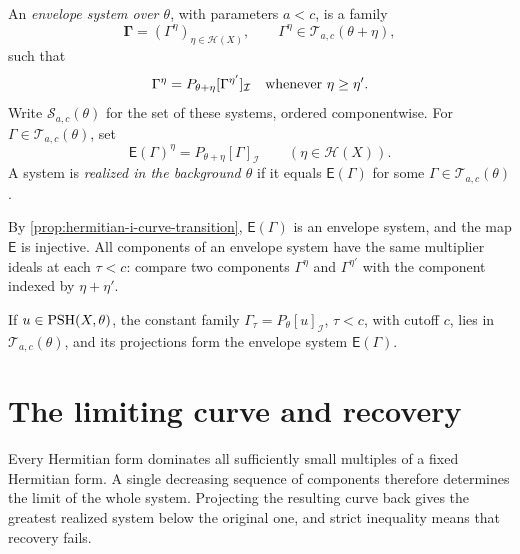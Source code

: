 \begin{definition}\label{def:hermitian-envelope-system}
An \emph{envelope system over $\theta$}, with parameters $a<c$, is a family
\[
 \boldsymbol\Gamma=(\Gamma^\eta)_{\eta\in\mathscr H(X)},
 \qquad \Gamma^\eta\in\mathscr T_{a,c}(\theta+\eta),
\]
such that
\begin{equation}\label{eq:hermitian-system-compatibility}
 \Gamma^\eta=P_{\theta+\eta}[\Gamma^{\eta'}]_{\mathcal I}
 \quad\hbox{whenever }\eta\geq\eta'.
\end{equation}
Write $\mathscr S_{a,c}(\theta)$ for the set of these systems, ordered componentwise. For $\Gamma\in\mathscr T_{a,c}(\theta)$, set
\[
 \mathsf E(\Gamma)^\eta=P_{\theta+\eta}[\Gamma]_{\mathcal I}
 \qquad(\eta\in\mathscr H(X)).
\]
A system is \emph{realized in the background $\theta$} if it equals $\mathsf E(\Gamma)$ for some $\Gamma\in\mathscr T_{a,c}(\theta)$.
\end{definition}

By \cref{prop:hermitian-i-curve-transition}, $\mathsf E(\Gamma)$ is an envelope system, and the map $\mathsf E$ is injective. All components of an envelope system have the same multiplier ideals at each $\tau<c$: compare two components $\Gamma^\eta$ and $\Gamma^{\eta'}$ with the component indexed by $\eta+\eta'$.

If $u\in\mathrm{PSH}(X,\theta)$, the constant family $\Gamma_\tau=P_\theta[u]_{\mathcal I}$, $\tau<c$, with cutoff $c$, lies in $\mathscr T_{a,c}(\theta)$, and its projections form the envelope system $\mathsf E(\Gamma)$.

\section{The limiting curve and recovery}\label{sec:system-limit-recovery}

Every Hermitian form dominates all sufficiently small multiples of a fixed Hermitian form. A single decreasing sequence of components therefore determines the limit of the whole system. Projecting the resulting curve back gives the greatest realized system below the original one, and strict inequality means that recovery fails.


